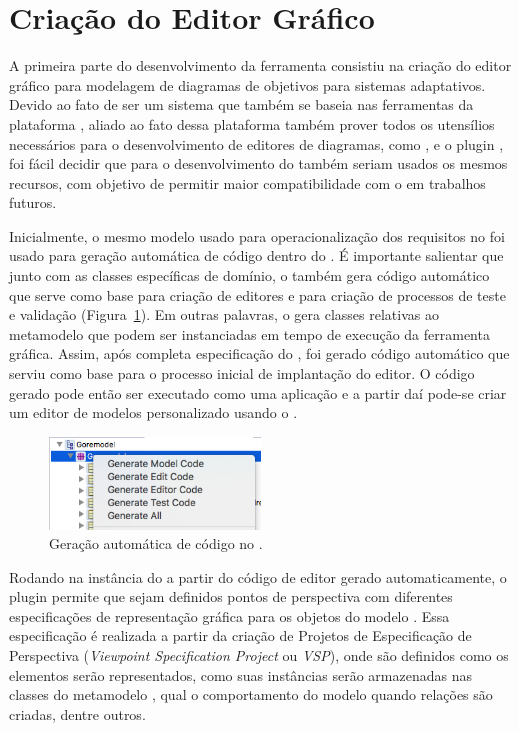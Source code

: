 \section{Criação do Editor Gráfico}
\label{sec-unagi-criacao-editor}

A primeira parte do desenvolvimento da ferramenta consistiu  na criação do editor gráfico para modelagem de diagramas de objetivos para sistemas adaptativos. Devido ao fato de \zanshin ser um sistema que também se baseia nas ferramentas da plataforma \eclipse, aliado ao fato dessa plataforma também prover todos os utensílios necessários para o desenvolvimento de editores de diagramas, como \ecore, \emf e o plugin \sirius, foi fácil decidir que para o desenvolvimento do \unagi também seriam usados os mesmos recursos, com objetivo de permitir maior compatibilidade com o \zanshin em trabalhos futuros.

Inicialmente, o mesmo modelo \ecore usado para operacionalização dos requisitos no \zanshin foi usado para geração automática de código dentro do \eclipse \emf. É importante salientar que junto com as classes específicas de domínio, o \emf também gera código automático que serve como base para criação de editores e para criação de processos de teste e validação (Figura~\ref{figura-gera-codigo}). Em outras palavras, o \emf gera classes relativas ao metamodelo que podem ser instanciadas em tempo de execução da ferramenta gráfica.  Assim, após completa especificação do \ecore, foi gerado código automático que serviu como base para o processo inicial de implantação do editor. O código gerado pode então ser executado como uma aplicação \eclipse e a partir daí pode-se criar um editor de modelos personalizado usando o \sirius.


\begin{figure}
	\centering
	\includegraphics[width=0.5\textwidth]{figuras/unagi/exemplo-gera-codigo.png}
	\caption{Geração automática de código no \eclipse.}
	\label{figura-gera-codigo}
\end{figure}

Rodando na instância do \eclipse a partir do código de editor gerado automaticamente, o plugin \sirius permite que sejam definidos pontos de perspectiva com diferentes especificações de representação gráfica para os objetos do modelo \ecore. Essa especificação é realizada a partir da criação de Projetos de Especificação de Perspectiva (\textit{Viewpoint Specification Project} ou \textit{VSP}), onde são definidos como os elementos serão representados, como suas instâncias serão armazenadas nas classes do metamodelo \ecore, qual o comportamento do modelo quando relações são criadas, dentre outros.

